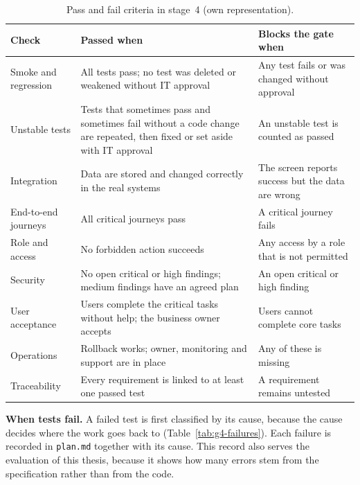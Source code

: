 \documentclass[10pt,a4paper]{article}
\begin{document}
\begin{table}[H]
    \centering
    \small
    \caption{Pass and fail criteria in stage~4 (own representation).}
    \label{tab:g4-criteria}
    \begin{tabular}{p{3.0cm} p{6.0cm} p{5.0cm}}
    \hline
    \textbf{Check} & \textbf{Passed when} & \textbf{Blocks the gate when} \\
    \hline
    Smoke and regression & All tests pass; no test was deleted or weakened
        without IT approval & Any test fails or was changed without
        approval \\
    Unstable tests & Tests that sometimes pass and sometimes fail without a
        code change are repeated, then fixed or set aside with IT approval &
        An unstable test is counted as passed \\
    Integration & Data are stored and changed correctly in the real
        systems & The screen reports success but the data are wrong \\
    End-to-end journeys & All critical journeys pass & A critical journey
        fails \\
    Role and access & No forbidden action succeeds & Any access by a role
        that is not permitted \\
    Security & No open critical or high findings; medium findings have an
        agreed plan & An open critical or high finding \\
    User acceptance & Users complete the critical tasks without help; the
        business owner accepts & Users cannot complete core tasks \\
    Operations & Rollback works; owner, monitoring and support are in place &
        Any of these is missing \\
    Traceability & Every requirement is linked to at least one passed test &
        A requirement remains untested \\
    \hline
    \end{tabular}
\end{table}

\textbf{When tests fail.} A failed test is first classified by its cause,
because the cause decides where the work goes back to
(Table~\ref{tab:g4-failures}). Each failure is recorded in \texttt{plan.md}
together with its cause. This record also serves the evaluation of this
thesis, because it shows how many errors stem from the specification rather
than from the code.
\end{document}
